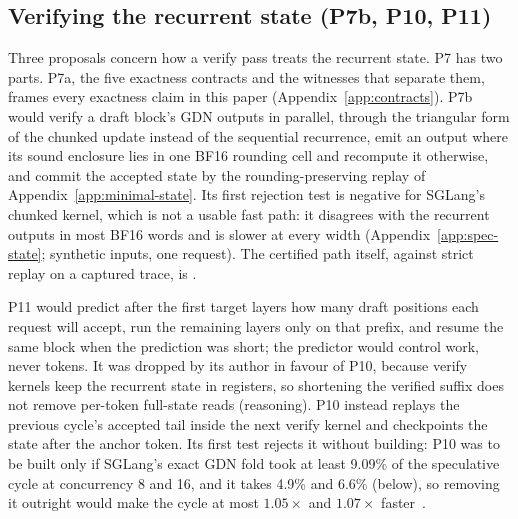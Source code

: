 \subsection{Verifying the recurrent state (P7b, P10, P11)}\label{app:verify-state}
Three proposals concern how a verify pass treats the recurrent state. P7 has two parts. P7a, the five exactness contracts and the witnesses that separate them, frames every exactness claim in this paper (Appendix~\ref{app:contracts}). P7b would verify a draft block's GDN outputs in parallel, through the triangular form of the chunked update instead of the sequential recurrence, emit an output where its sound enclosure lies in one BF16 rounding cell and recompute it otherwise, and commit the accepted state by the rounding-preserving replay of Appendix~\ref{app:minimal-state}. Its first rejection test is negative for SGLang's chunked kernel, which is not a usable fast path: it disagrees with the recurrent outputs in most BF16 words and is slower at every width (Appendix~\ref{app:spec-state}; synthetic inputs, one request). The certified path itself, against strict replay on a captured trace, is .

P11 would predict after the first target layers how many draft positions each request will accept, run the remaining layers only on that prefix, and resume the same block when the prediction was short; the predictor would control work, never tokens. It was dropped by its author in favour of P10, because verify kernels keep the recurrent state in registers, so shortening the verified suffix does not remove per-token full-state reads (reasoning). P10 instead replays the previous cycle's accepted tail inside the next verify kernel and checkpoints the state after the anchor token. Its first test rejects it without building: P10 was to be built only if SGLang's exact GDN fold took at least 9.09\% of the speculative cycle at concurrency 8 and 16, and it takes 4.9\% and 6.6\% (below), so removing it outright would make the cycle at most $1.05\times$ and $1.07\times$ faster~.

